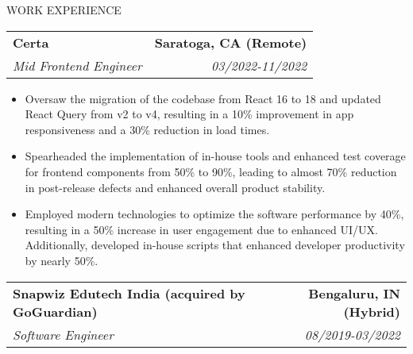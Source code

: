 \documentclass{resume} %
\begin{document}
\vspace{-5pt}
\begin{rSection}{WORK EXPERIENCE}

   \begin{tabularx}{\textwidth}{@{}X r}
      \textbf{Certa} & \textbf{Saratoga, CA (Remote)} \\
      \textit{Mid Frontend Engineer} & \textit{03/2022-11/2022} \\
   \end{tabularx}

   \begin{minipage}[t]{1\textwidth}
      \begin{itemize}[left=0pt, nosep, before=\vspace{-0.5\baselineskip}]
         \item \small Oversaw the migration of the codebase from React 16 to 18 and updated React Query from v2 to v4, resulting in a 10\% improvement in app responsiveness and a 30\% reduction in load times.
         \item \small Spearheaded the implementation of in-house tools and enhanced test coverage for frontend components from 50\% to 90\%, leading to almost 70\% reduction in post-release defects and enhanced overall product stability.
         \item \small Employed modern technologies to optimize the software performance by 40\%, resulting in a 50\% increase in user engagement due to enhanced UI/UX. Additionally, developed in-house scripts that enhanced developer productivity by nearly 50\%.
      \end{itemize}
   \end{minipage}

   \begin{tabularx}{\textwidth}{@{}X r}
      \textbf{Snapwiz Edutech India (acquired by GoGuardian)} & \textbf{Bengaluru, IN (Hybrid)} \\
      \textit{Software Engineer} & \textit{08/2019-03/2022} \\
   \end{tabularx}


\end{rSection}
\end{document}
